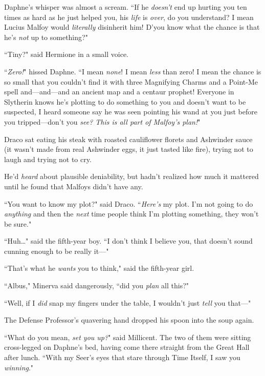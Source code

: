 Daphne's whisper was almost a scream. ``If he \emph{doesn't} end up hurting you ten times as hard as he just helped you, his \emph{life} is \emph{over}, do you understand? I mean Lucius Malfoy would \emph{literally} disinherit him! D'you know what the chance is that he's \emph{not} up to something?"

``Tiny?" said Hermione in a small voice.

``\emph{Zero!}" hissed Daphne. ``I mean \emph{none}! I mean \emph{less} than zero! I mean the chance is so small that you couldn't find it with three Magnifying Charms and a Point-Me spell and—and—and an ancient map and a centaur prophet! Everyone in Slytherin knows he's plotting to do something to you and doesn't want to be suspected, I heard someone say he was seen pointing his wand at you just before you tripped—don't you \emph{see? This is all part of Malfoy's plan!}"

\later

Draco sat eating his steak with roasted cauliflower florets and Ashwinder sauce (it wasn't made from real Ashwinder eggs, it just tasted like fire), trying not to laugh and trying not to cry.

He'd \emph{heard} about plausible deniability, but hadn't realized how much it mattered until he found that Malfoys didn't have any.

``You want to know my plot?" said Draco. ``\emph{Here's} my plot. I'm not going to do \emph{anything} and then the \emph{next} time people think I'm plotting something, they won't be sure."

``Huh{\ldots}" said the fifth-year boy. ``I don't think I believe you, that doesn't sound cunning enough to be really it—"

``That's what he \emph{wants} you to think," said the fifth-year girl.

\later

``Albus," Minerva said dangerously, ``did you \emph{plan} all this?"

\later

``Well, if I \emph{did} snap my fingers under the table, I wouldn't just \emph{tell} you that—"

\later

The Defense Professor's quavering hand dropped his spoon into the soup again.

\later

``What do you mean, \emph{set you up?}" said Millicent. The two of them were sitting cross-legged on Daphne's bed, having come there straight from the Great Hall after lunch. ``With my Seer's eyes that stare through Time Itself, I saw you \emph{winning}."

